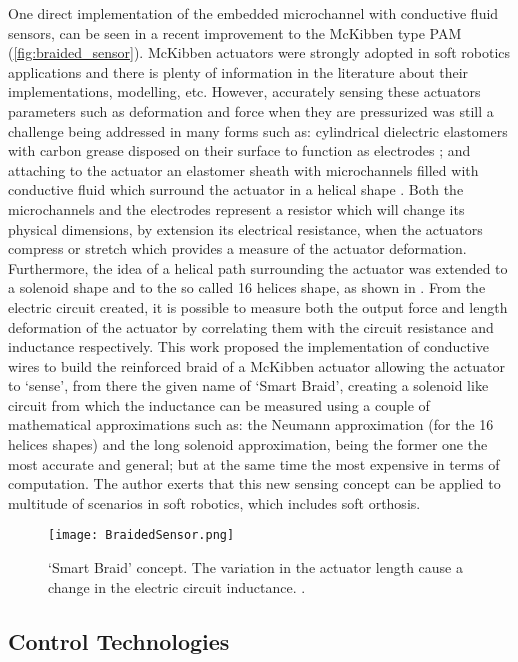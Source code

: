 One direct implementation of the embedded microchannel with conductive fluid sensors, can be seen in a recent improvement to the McKibben type PAM (\autoref{fig:braided_sensor}). McKibben actuators were strongly adopted in soft robotics applications and there is plenty of information in the literature about their implementations, modelling, etc. However, accurately sensing these actuators parameters such as deformation and force when they are pressurized was still a challenge being addressed in many forms such as: cylindrical dielectric elastomers with carbon grease disposed on their surface to function as electrodes \cite{Goulbourne2007}; and attaching to the actuator an elastomer sheath with microchannels filled with conductive fluid which surround the actuator in a helical shape \cite{Park2013}. Both the microchannels and the electrodes represent a resistor which will change its physical dimensions, by extension its electrical resistance, when the actuators compress or stretch which provides a measure of the actuator deformation. Furthermore, the idea of a helical path surrounding the actuator was extended to a solenoid shape and to the so called 16 helices shape, as shown in \cite{Felt2014,Felt2015}. From the electric circuit created, it is possible to measure both the output force and length deformation of the actuator by correlating them with the circuit resistance and inductance respectively. This work proposed the implementation of conductive wires to build the reinforced braid of a McKibben actuator allowing the actuator to `sense', from there the given name of `Smart Braid', creating a solenoid like circuit from which the inductance can be measured using a couple of mathematical approximations such as: the Neumann approximation (for the 16 helices shapes) and the long solenoid approximation, being the former one the most accurate and general; but at the same time the most expensive in terms of computation. The author exerts that this new sensing concept can be applied to multitude of scenarios in soft robotics, which includes soft orthosis.

\begin{figure}[hbtp!]
    \centering
    \texttt{[image: BraidedSensor.png]}
    \caption{`Smart Braid' concept. The variation in the actuator length cause a change in the electric circuit inductance. \cite{Felt2015}. }
    \label{fig:braided_sensor}
\end{figure}

\subsection{Control Technologies} \label{sec:controlSystems}

